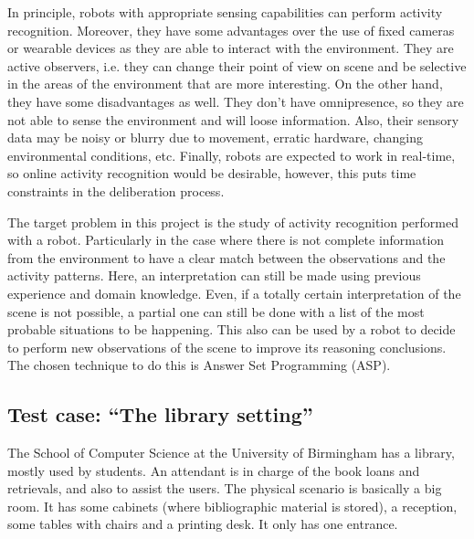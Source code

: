 In principle, robots with appropriate sensing capabilities can perform activity recognition. 
Moreover, they have some advantages over the use of fixed cameras or wearable devices as they are able to interact with the environment. 
They are active observers, i.e. they can change their point of view on scene and be selective in the areas of the environment that are more interesting. 
On the other hand, they have some disadvantages as well. 
They don't have omnipresence, so they are not able to sense the environment and will loose information. 
Also, their sensory data may be noisy or blurry due to movement, erratic hardware, changing environmental conditions, etc. 
Finally, robots are expected to work in real-time, so online activity recognition would be desirable, however, this puts time constraints in the deliberation process.


The target problem in this project is the study of activity recognition performed with a robot. 
Particularly in the case where there is not complete information from the environment to have a clear match between the observations and the activity patterns. 
Here, an interpretation can still be made using previous experience and domain knowledge. 
Even, if a totally certain interpretation of the scene is not possible, a partial one can still be done with a list of the most probable situations to be happening. 
This also can be used by a robot to decide to perform new observations of the scene to improve its reasoning conclusions. 
The chosen technique to do this is Answer Set Programming (ASP).



\subsection{Test case: ``The library setting''} \label{sec_Library} %

The School of Computer Science at the University of Birmingham has a library, mostly used by students.
An attendant is in charge of the book loans and retrievals, and also to assist the users.
The physical scenario is basically a big room. It has some cabinets (where bibliographic material is stored), a reception, some tables with chairs and a printing desk. It only has one entrance.

